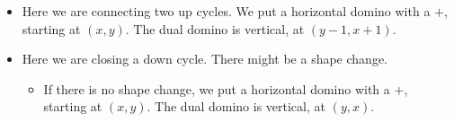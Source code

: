 \documentclass[12pt]{article}
\numberwithin{equation}{section}
\newcommand{\horizontalDominoMaybe}[3]{\filldraw [dominoMaybeStyle] (#2 - 1 + \eps, #1 - 1 + \eps) rectangle + (2 - \teps, 1 -\teps) node [dominoText] {$#3$};}
\newcommand{\horizontalDominoMaybeShift}[4]{\filldraw [dominoMaybeStyle] (#2 - 1 + #4 + \eps, #1 - 1 + \eps) rectangle + (2 - \teps, 1 -\teps) node [dominoText] {$#3$};}
\begin{document}
\begin{itemize}
    \item Here we are connecting two up cycles.
    We put a horizontal domino with a $+$, starting at $(x, y)$.
   The dual domino is vertical, at $(y - 1, x + 1)$.
   \begin{figure}[H]
     \centering
   \end{figure}

   \begin{figure}[H]
     \centering
  \end{figure}

   \item Here we are closing a down cycle.
   There might be a shape change.
   \begin{itemize}
     \item If there is no shape change, we put a horizontal domino with a $+$, starting at $(x, y)$.
     The dual domino is vertical, at $(y, x)$.
     \begin{figure}[H]
       \centering
\end{figure}
\end{itemize}
\end{itemize}
\end{document}
